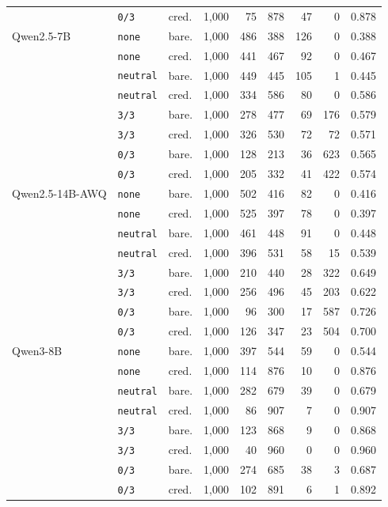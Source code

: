 \begin{tabular}{lllrrrrrr}
 & \texttt{0/3} & cred. & 1,000 & 75 & 878 & 47 & 0 & 0.878 \\
Qwen2.5-7B & \texttt{none} & bare. & 1,000 & 486 & 388 & 126 & 0 & 0.388 \\
 & \texttt{none} & cred. & 1,000 & 441 & 467 & 92 & 0 & 0.467 \\
 & \texttt{neutral} & bare. & 1,000 & 449 & 445 & 105 & 1 & 0.445 \\
 & \texttt{neutral} & cred. & 1,000 & 334 & 586 & 80 & 0 & 0.586 \\
 & \texttt{3/3} & bare. & 1,000 & 278 & 477 & 69 & 176 & 0.579 \\
 & \texttt{3/3} & cred. & 1,000 & 326 & 530 & 72 & 72 & 0.571 \\
 & \texttt{0/3} & bare. & 1,000 & 128 & 213 & 36 & 623 & 0.565 \\
 & \texttt{0/3} & cred. & 1,000 & 205 & 332 & 41 & 422 & 0.574 \\
Qwen2.5-14B-AWQ & \texttt{none} & bare. & 1,000 & 502 & 416 & 82 & 0 & 0.416 \\
 & \texttt{none} & cred. & 1,000 & 525 & 397 & 78 & 0 & 0.397 \\
 & \texttt{neutral} & bare. & 1,000 & 461 & 448 & 91 & 0 & 0.448 \\
 & \texttt{neutral} & cred. & 1,000 & 396 & 531 & 58 & 15 & 0.539 \\
 & \texttt{3/3} & bare. & 1,000 & 210 & 440 & 28 & 322 & 0.649 \\
 & \texttt{3/3} & cred. & 1,000 & 256 & 496 & 45 & 203 & 0.622 \\
 & \texttt{0/3} & bare. & 1,000 & 96 & 300 & 17 & 587 & 0.726 \\
 & \texttt{0/3} & cred. & 1,000 & 126 & 347 & 23 & 504 & 0.700 \\
Qwen3-8B & \texttt{none} & bare. & 1,000 & 397 & 544 & 59 & 0 & 0.544 \\
 & \texttt{none} & cred. & 1,000 & 114 & 876 & 10 & 0 & 0.876 \\
 & \texttt{neutral} & bare. & 1,000 & 282 & 679 & 39 & 0 & 0.679 \\
 & \texttt{neutral} & cred. & 1,000 & 86 & 907 & 7 & 0 & 0.907 \\
 & \texttt{3/3} & bare. & 1,000 & 123 & 868 & 9 & 0 & 0.868 \\
 & \texttt{3/3} & cred. & 1,000 & 40 & 960 & 0 & 0 & 0.960 \\
 & \texttt{0/3} & bare. & 1,000 & 274 & 685 & 38 & 3 & 0.687 \\
 & \texttt{0/3} & cred. & 1,000 & 102 & 891 & 6 & 1 & 0.892 \\

\end{tabular}
